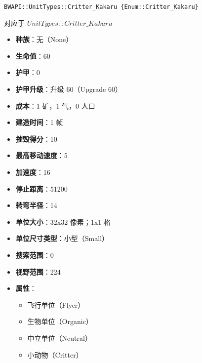 \begin{tcolorbox}[colback=white, colframe=black!60!white, title=Critter\_Kakaru(), arc=0mm]
    \begin{verbatim}
BWAPI::UnitTypes::Critter_Kakaru {Enum::Critter_Kakaru}
    \end{verbatim}
    对应于  $UnitTypes::Critter\_Kakaru$ 
    \begin{itemize}
        \item \textbf{种族}：无（None）
        \item \textbf{生命值}：60
        \item \textbf{护甲}：0
        \item \textbf{护甲升级}：升级 60（Upgrade 60）
        \item \textbf{成本}：1 矿，1 气，0 人口
        \item \textbf{建造时间}：1 帧
        \item \textbf{摧毁得分}：10
        \item \textbf{最高移动速度}：5
        \item \textbf{加速度}：16
        \item \textbf{停止距离}：51200
        \item \textbf{转弯半径}：14
        \item \textbf{单位大小}：32x32 像素；1x1 格
        \item \textbf{单位尺寸类型}：小型（Small）
        \item \textbf{搜索范围}：0
        \item \textbf{视野范围}：224
        \item \textbf{属性}：
            \begin{itemize}
                \item 飞行单位（Flyer）
                \item 生物单位（Organic）
                \item 中立单位（Neutral）
                \item 小动物（Critter）
            \end{itemize}
    \end{itemize}
\end{tcolorbox}

